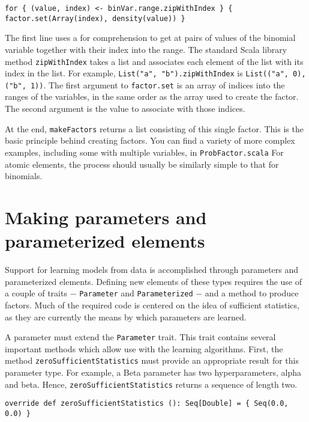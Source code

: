 \begin{flushleft}
\texttt{for \{ (value, index) <- binVar.range.zipWithIndex \} \{
\newline \tab factor.set(Array(index), density(value))
\newline \}
}
\end{flushleft}

The first line uses a for comprehension to get at pairs of values of the binomial variable together with their index into the range. The standard Scala library method \texttt{zipWithIndex} takes a list and associates each element of the list with its index in the list. For example, \texttt{List("a", "b").zipWithIndex} is \texttt{List(("a", 0), ("b", 1))}. The first argument to \texttt{factor.set} is an array of indices into the ranges of the variables, in the same order as the array used to create the factor. The second argument is the value to associate with those indices.

At the end, \texttt{makeFactors} returns a list consisting of this single factor. This is the basic principle behind creating factors. You can find a variety of more complex examples, including some with multiple variables, in  \texttt{ProbFactor.scala} For atomic elements, the process should usually be similarly simple to that for binomials.

\section{Making parameters and parameterized elements}

Support for learning models from data is accomplished through parameters and parameterized elements. Defining new elements of these types requires the use of a couple of traits $-$ \texttt{Parameter} and \texttt{Parameter\-ized} $-$ and a method to produce factors. Much of the required code is centered on the idea of sufficient statistics, as they are currently the means by which parameters are learned. 

A parameter must extend the \texttt{Parameter} trait. This trait contains several important methods which allow use with the learning algorithms. First, the method \texttt{zeroSufficientStatistics} must provide an appropriate result for this parameter type. For example, a Beta parameter has two hyperparameters, alpha and beta. Hence, \texttt{zeroSufficientStatistics} returns a sequence of length two.

\begin{flushleft}
\texttt{override def zeroSufficientStatistics (): Seq[Double] = \{ 
\newline \tab Seq(0.0, 0.0)
\newline \}
}
\end{flushleft}

